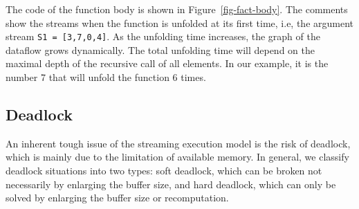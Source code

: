 
The code of the function body is shown in Figure~\ref{fig-fact-body}. 
The comments show the streams when the function is unfolded at its first time, i.e, the argument stream \texttt{S1 = [3,7,0,4]}. 
As the unfolding time increases, the graph of the dataflow grows dynamically. 
The total unfolding time will depend on the maximal depth of the recursive call of all elements. 
In our example, it is the number 7 that will unfold the function 6 times.\\



\subsection{Deadlock}
An inherent tough issue of the streaming execution model is the risk of deadlock, which is mainly due to the limitation of available memory.
In general, we classify deadlock situations into two types: soft deadlock, which can be broken not necessarily by enlarging the buffer size, and hard deadlock, which can only be solved by enlarging the buffer size or recomputation. 

